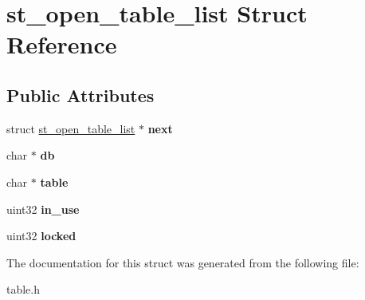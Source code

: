 \hypertarget{structst__open__table__list}{}\section{st\+\_\+open\+\_\+table\+\_\+list Struct Reference}
\label{structst__open__table__list}
\subsection*{Public Attributes}
\begin{DoxyCompactItemize}
\item 
\mbox{\label{structst__open__table__list_aa2988428be7f7661f6e80698aa4cd909}} 
struct \mbox{\hyperlink{structst__open__table__list}{st\+\_\+open\+\_\+table\+\_\+list}} $\ast$ {\bfseries next}
\item 
\mbox{\label{structst__open__table__list_a4f56efd20d8b81eba8de57098fb485f0}} 
char $\ast$ {\bfseries db}
\item 
\mbox{\label{structst__open__table__list_a17325be129693dc4989941cad203ae36}} 
char $\ast$ {\bfseries table}
\item 
\mbox{\label{structst__open__table__list_ab337b947dcefe00f6aab8a0d4ea10ee9}} 
uint32 {\bfseries in\+\_\+use}
\item 
\mbox{\label{structst__open__table__list_ab54acea6eba99db2880be28c78689fc4}} 
uint32 {\bfseries locked}
\end{DoxyCompactItemize}


The documentation for this struct was generated from the following file\+:\begin{DoxyCompactItemize}
\item 
table.\+h\end{DoxyCompactItemize}
